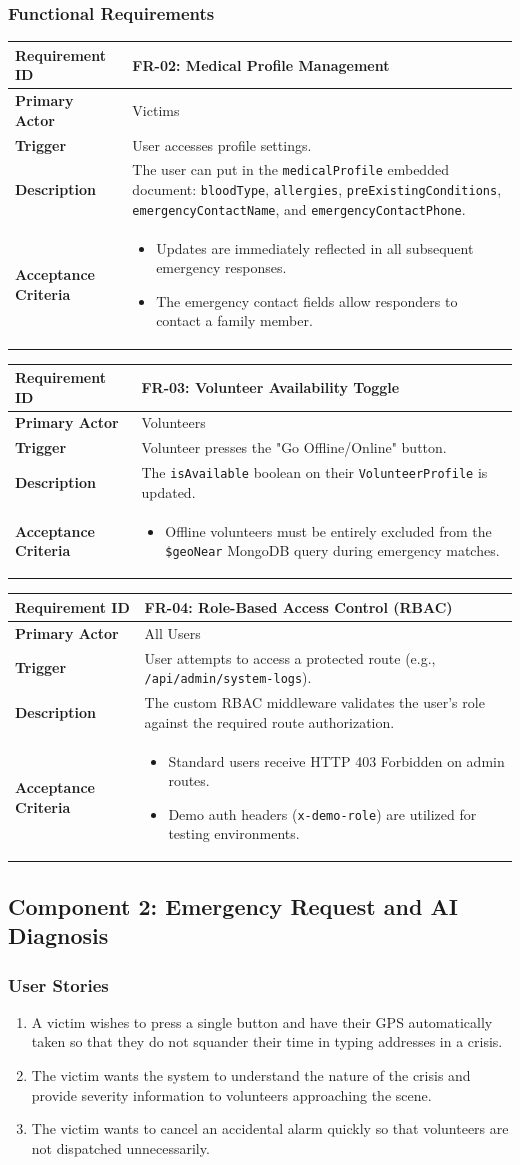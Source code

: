 \documentclass[12pt,a4paper]{article}
\newcommand{\frbox}[5]{%
  \begin{table}[H]
  \centering
  \begin{tabularx}{\textwidth}{|l|X|}
  \hline
  \rowcolor{lightorange}
  \textbf{Requirement ID} & \textbf{#1} \\
  \hline
  \textbf{Primary Actor} & #2 \\
  \hline
  \textbf{Trigger} & #3 \\
  \hline
  \textbf{Description} & #4 \\
  \hline
  \rowcolor{lightorange}
  \textbf{Acceptance Criteria} & #5 \\
  \hline
  \end{tabularx}
  \end{table}
}
\begin{document}
\subsubsection*{Functional Requirements}


\frbox{FR-02: Medical Profile Management}
{Victims}
{User accesses profile settings.}
{The user can put in the \texttt{medicalProfile} embedded document: \texttt{bloodType}, \texttt{allergies}, \texttt{preExistingConditions}, \texttt{emergencyContactName}, and \texttt{emergencyContactPhone}.}
{%
\begin{itemize}[leftmargin=1.5em]
  \item Updates are immediately reflected in all subsequent emergency responses.
  \item The emergency contact fields allow responders to contact a family member.
\end{itemize}
}

\frbox{FR-03: Volunteer Availability Toggle}
{Volunteers}
{Volunteer presses the "Go Offline/Online" button.}
{The \texttt{isAvailable} boolean on their \texttt{VolunteerProfile} is updated.}
{%
\begin{itemize}[leftmargin=1.5em]
  \item Offline volunteers must be entirely excluded from the \texttt{\$geoNear} MongoDB query during emergency matches.
\end{itemize}
}

\frbox{FR-04: Role-Based Access Control (RBAC)}
{All Users}
{User attempts to access a protected route (e.g., \texttt{/api/admin/system-logs}).}
{The custom RBAC middleware validates the user's role against the required route authorization.}
{%
\begin{itemize}[leftmargin=1.5em]
  \item Standard users receive HTTP 403 Forbidden on admin routes.
  \item Demo auth headers (\texttt{x-demo-role}) are utilized for testing environments.
\end{itemize}
}

\subsection{Component 2: Emergency Request and AI Diagnosis}

\subsubsection*{User Stories}
\begin{enumerate}[leftmargin=2em]
  \item A victim wishes to press a single button and have their GPS automatically taken so that they do not squander their time in typing addresses in a crisis.
  \item The victim wants the system to understand the nature of the crisis and provide severity information to volunteers approaching the scene.
  \item The victim wants to cancel an accidental alarm quickly so that volunteers are not dispatched unnecessarily.
\end{enumerate}
\end{document}

